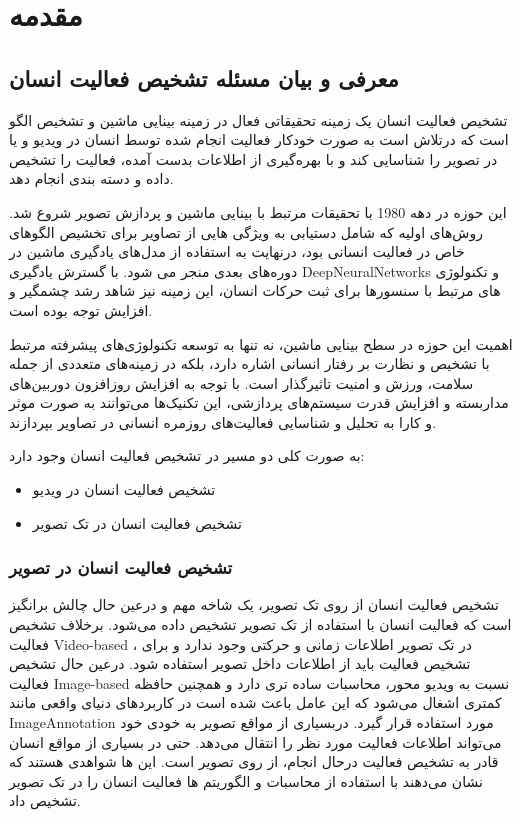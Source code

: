 
\chapter{مقدمه}
\section{معرفی و بیان مسئله تشخیص فعالیت انسان}
تشخیص فعالیت انسان یک زمینه تحقیقاتی فعال در زمینه بینایی ماشین و تشخیص الگو است که درتلاش است به صورت خودکار فعالیت انجام شده توسط انسان در ویدیو و یا در تصویر را شناسایی کند و با بهره‌گیری از اطلاعات بدست آمده، فعالیت را تشخیص داده و دسته بندی انجام دهد.

این حوزه در دهه 1980 با تحقیقات مرتبط با بینایی ماشین و پردازش تصویر شروع شد.‌ روش‌های اولیه که شامل دستیابی به ویژگی هایی از تصاویر برای تخشیص الگوهای خاص در فعالیت انسانی بود، درنهایت به استفاده از مدل‌های یادگیری ماشین در دوره‌های بعدی منجر می شود.
با گسترش یادگیری 
\gls{DeepNeuralNetworks}
 و تکنولوژی های مرتبط با سنسورها برای ثبت حرکات انسان، این زمینه نیز شاهد رشد چشمگیر و افزایش توجه بوده است.

اهمیت این حوزه در سطح بینایی ماشین، نه تنها به توسعه تکنولوژی‌های پیشرفته مرتبط با تشخیص و نظارت بر رفتار انسانی اشاره دارد، بلکه در زمینه‌های متعددی از جمله سلامت، ورزش و امنیت تاثیرگذار است. با توجه به افزایش روزافزون دوربین‌های مداربسته و افزایش قدرت سیستم‌های پردازشی، این تکنیک‌ها می‌توانند به صورت موثر و کارا به تحلیل و شناسایی فعالیت‌های روزمره انسانی در تصاویر بپردازند.

به صورت کلی دو مسیر در تشخیص فعالیت انسان وجود دارد:
\vspace{-4pt}
\begin{itemize}
	\setlength\itemsep{-1pt}
	\item تشخیص فعالیت انسان در ویدیو
	\item تشخیص فعالیت انسان در تک تصویر
\end{itemize}
\subsection{تشخیص فعالیت انسان در تصویر}
تشخیص فعالیت انسان از روی تک تصویر، یک شاخه مهم و درعین حال چالش برانگیز است که فعالیت انسان با استفاده از تک تصویر تشخیص داده می‌شود.
برخلاف تشخیص فعالیت %
\gls{Video-based}
، در تک تصویر اطلاعات زمانی و حرکتی وجود ندارد و برای تشخیص فعالیت باید از اطلاعات داخل تصویر استفاده شود. درعین حال تشخیص فعالیت %
\gls{Image-based}
 نسبت به ویدیو محور، محاسبات ساده تری دارد و همچنین حافظه کمتری اشغال می‌شود که این عامل باعث شده است در کاربرد‌های دنیای واقعی مانند %
\gls{ImageAnnotation}
 مورد استفاده قرار گیرد.
 دربسیاری از مواقع تصویر به خودی خود می‌تواند اطلاعات فعالیت مورد نظر را انتقال می‌دهد. حتی در بسیاری از مواقع انسان قادر به تشخیص فعالیت درحال انجام، از روی تصویر است. این ها شواهدی هستند که نشان می‌دهند با استفاده از محاسبات و الگوریتم ها فعالیت انسان را در تک تصویر تشخیص داد.
 
